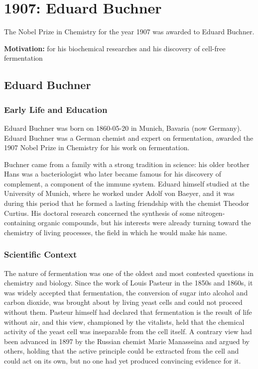 \chapter{1907: Eduard Buchner}
\label{chap:chemistry1907}

The Nobel Prize in Chemistry for the year 1907 was awarded to Eduard Buchner.

\textbf{Motivation:}
for his biochemical researches and his discovery of cell-free fermentation

\section{Eduard Buchner}

\subsection*{Early Life and Education}

Eduard Buchner was born on 1860-05-20 in Munich, Bavaria (now Germany).
Eduard Buchner was a German
chemist
and expert on fermentation, awarded the 1907
Nobel Prize in Chemistry for his work on
fermentation.

Buchner came from a family with a strong tradition in science: his older brother Hans was a bacteriologist who later became famous for his discovery of complement, a component of the immune system. Eduard himself studied at the University of Munich, where he worked under Adolf von Baeyer, and it was during this period that he formed a lasting friendship with the chemist Theodor Curtius. His doctoral research concerned the synthesis of some nitrogen-containing organic compounds, but his interests were already turning toward the chemistry of living processes, the field in which he would make his name.

\subsection*{Scientific Context}

The nature of fermentation was one of the oldest and most contested questions in chemistry and biology. Since the work of Louis Pasteur in the 1850s and 1860s, it was widely accepted that fermentation, the conversion of sugar into alcohol and carbon dioxide, was brought about by living yeast cells and could not proceed without them. Pasteur himself had declared that fermentation is the result of life without air, and this view, championed by the vitalists, held that the chemical activity of the yeast cell was inseparable from the cell itself. A contrary view had been advanced in 1897 by the Russian chemist Marie Manasseina and argued by others, holding that the active principle could be extracted from the cell and could act on its own, but no one had yet produced convincing evidence for it.

